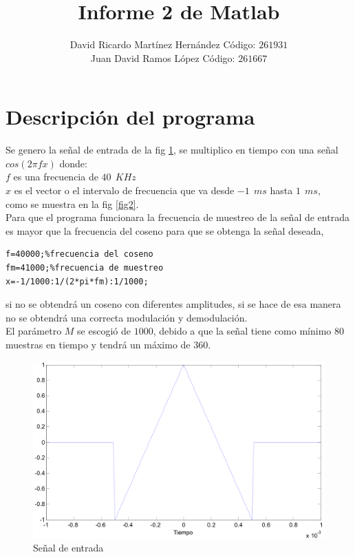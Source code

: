 \documentclass[onecolumn]{IEEEtran}
\begin{document}
\title{Informe 2 de Matlab}
\author{David Ricardo Martínez Hernández Código: $261931$\\
	Juan David Ramos López Código: $261667$}
\maketitle
{}
\section{Descripción del programa}
\noindent
Se genero la señal de entrada de la fig \ref{fig1}, se multiplico en tiempo con una señal $cos(2 \pi fx)$ donde:\\
$f$ es una frecuencia de $40 \ \ KHz$\\
$x$ es el vector o el intervalo de frecuencia que va desde $-1\ \ ms$ hasta $1\ \ ms$,\\
como se muestra en la fig \ref{fig2}.\\
Para que el programa funcionara la frecuencia de muestreo de la señal de  entrada  es mayor que la frecuencia del coseno para que se obtenga la señal deseada,
\begin{verbatim}
f=40000;%frecuencia del coseno
fm=41000;%frecuencia de muestreo
x=-1/1000:1/(2*pi*fm):1/1000;
\end{verbatim}
\noindent
si no se obtendrá un coseno con diferentes amplitudes, si se hace de esa manera no se obtendrá una correcta modulación y demodulación.\\
El parámetro $M$ se escogió de $1000$, debido a que la señal tiene como mínimo $80$ muestras en tiempo y tendrá un máximo de $360$.
\begin{figure}[h]
	\centering
		\includegraphics[scale=0.25]{0.png}
	\caption{Señal de entrada}
    \label{fig1}
\end{figure}
\end{document}
